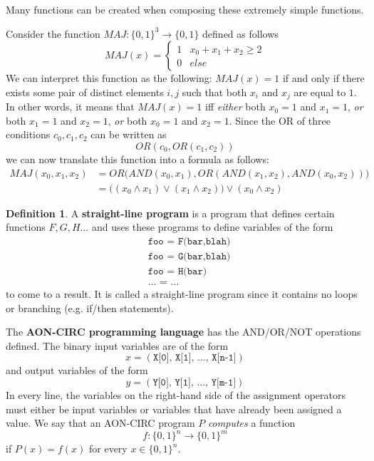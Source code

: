 \documentclass[a4paper, 12pt]{report}
\theoremstyle{remark}
\theoremstyle{definition}
\newtheorem{definition}{Definition}[section]
\begin{document}
Many functions can be created when composing these extremely simple functions. 

\begin{example}
Consider the function $MAJ: \{0,1\}^3 \longrightarrow \{0,1\}$ defined as follows
\[MAJ (x) = \begin{cases}
1 & x_0 + x_1 + x_2 \geq 2 \\
0 & else
\end{cases}\]
We can interpret this function as the following: $MAJ(x) = 1$ if and only if there exists some pair of distinct elements $i, j$ such that both $x_i$ and $x_j$ are equal to $1$. In other words, it means that $MAJ(x) = 1$ iff \textit{either} both $x_0 = 1$ and $x_1 = 1$, \textit{or} both $x_1 = 1$ and $x_2 = 1$, \textit{or} both $x_0 = 1$ and $x_2 = 1$. Since the OR of three conditions $c_0, c_1, c_2$ can be written as
\[OR(c_0, OR(c_1, c_2))\]
we can now translate this function into a formula as follows: 
\begin{align*}
    MAJ(x_0, x_1, x_2) & = OR\big( AND (x_0, x_1), OR(AND(x_1, x_2), AND(x_0, x_2)) \big) \\
    & = \big((x_0 \wedge x_1) \vee (x_1 \wedge x_2)\big) \vee (x_0 \wedge x_2)
\end{align*}
\end{example}

\begin{definition}
A \textbf{straight-line program} is a program that defines certain functions $F, G, H...$ and uses these programs to define variables of the form 
\begin{align*}
    &\texttt{foo = F(bar,blah)} \\
    &\texttt{foo = G(bar,blah)} \\
    &\texttt{foo = H(bar)} \\
    &\texttt{... = ...}
\end{align*}
to come to a result. It is called a straight-line program since it contains no loops or branching (e.g. if/then statements). 

The \textbf{AON-CIRC programming language} has the AND/OR/NOT operations defined. The binary input variables are of the form 
\[x = (\texttt{X[0], X[1], ..., X[n-1]})\]
and output variables of the form 
\[y = (\texttt{Y[0], Y[1], ..., Y[m-1]})\]
In every line, the variables on the right-hand side of the assignment operators must either be input variables or variables that have already been assigned a value. We say that an AON-CIRC program $P$ \textit{computes} a function 
\[f: \{0,1\}^n \longrightarrow \{0,1\}^m\]
if $P(x) = f(x)$ for every $x \in \{0,1\}^n$.
\end{definition}
\end{document}
